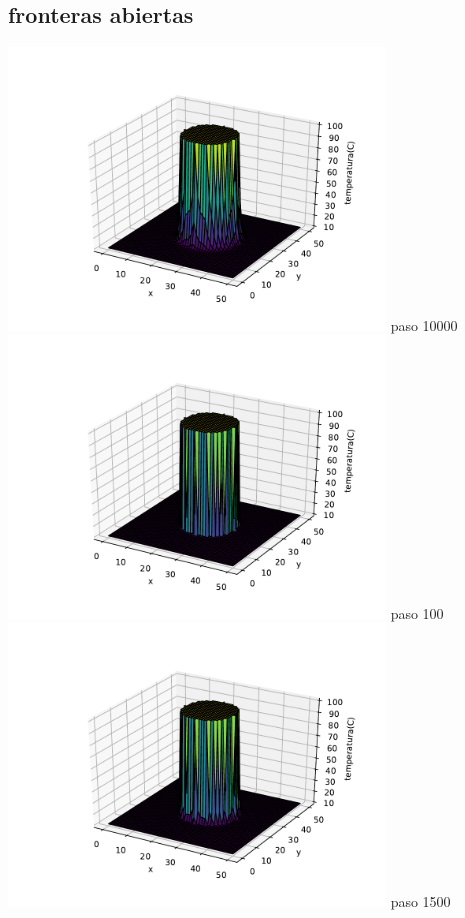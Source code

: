 \documentclass[12pt]{article}
\begin{document}
\begin{centering}
\subsection{fronteras abiertas}
\includegraphics[width=0.75\textwidth]{3d5.pdf}
paso 10000
\\
\includegraphics[width=0.75\textwidth]{3d6.pdf}
paso 100
\\
\includegraphics[width=0.75\textwidth]{3d7.pdf}
paso 1500

\end{centering}
\end{document}

